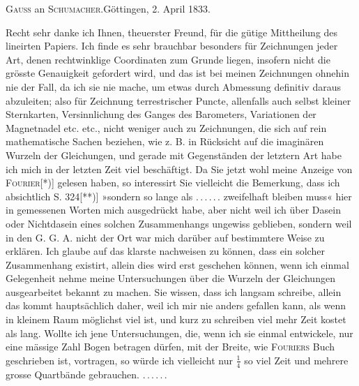 \begin{center}\large\textsc{Gauss} an \textsc{Schumacher}.\quad Göttingen, 2. April 1833.\end{center}
\noindent\hspace*{\parindent}Recht sehr danke ich Ihnen, theuerster Freund, für die gütige Mittheilung
des lineirten Papiers. Ich finde es sehr brauchbar besonders für Zeichnungen
jeder Art, denen rechtwinklige Coordinaten zum Grunde liegen, insofern
nicht die grösste Genauigkeit gefordert wird, und das ist bei meinen
Zeichnungen ohnehin nie der Fall, da ich sie nie mache, um etwas durch
Abmessung definitiv daraus abzuleiten; also für Zeichnung terrestrischer Puncte,
allenfalls auch selbst kleiner Sternkarten, Versinnlichung des Ganges des Barometers,
Variationen der Magnetnadel etc. etc., nicht weniger auch zu Zeichnungen,
die sich auf rein mathematische Sachen beziehen, wie z. B. in Rücksicht
auf die imaginären Wurzeln der Gleichungen, und gerade mit Gegenständen
der letztern Art habe ich mich in der letzten Zeit viel beschäftigt.
\clearpage
{}
\noindent Da Sie jetzt wohl meine Anzeige von \textsc{Fourier}[*)] gelesen haben, so interessirt
Sie vielleicht die Bemerkung, dass ich absichtlich S. 324[**)] »sondern
so lange als .\,.\,.\,.\,.\,. zweifelhaft bleiben muss« hier in gemessenen Worten
mich ausgedrückt habe, aber nicht weil ich  über Dasein oder Nichtdasein
eines solchen Zusammenhangs ungewiss geblieben, sondern weil in den
G. G. A. nicht der Ort war mich darüber auf bestimmtere Weise zu erklären.
Ich glaube auf das klarste nachweisen zu können, dass ein solcher Zusammenhang
 existirt, allein dies wird erst geschehen können, wenn ich einmal
Gelegenheit nehme meine Untersuchungen über die Wurzeln der Gleichungen
ausgearbeitet bekannt zu machen. Sie wissen, dass ich langsam schreibe,
allein das kommt hauptsächlich daher, weil ich mir nie anders gefallen kann,
als wenn in kleinem Raum möglichst viel ist, und kurz zu schreiben viel mehr
Zeit kostet als lang. Wollte ich jene Untersuchungen, die, wenn ich sie
einmal entwickele, nur eine mässige Zahl Bogen betragen dürfen, mit der
Breite, wie \textsc{Fouriers} Buch geschrieben ist, vortragen, so würde ich vielleicht
nur $\tfrac14$ so viel Zeit und mehrere grosse Quartbände gebrauchen.
.\,.\,.\,.\,.\,.
